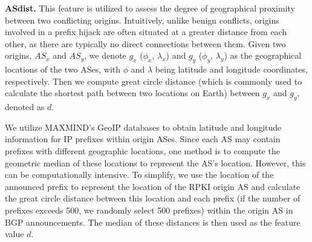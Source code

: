 \noindent\textbf{ASdist.} This feature is utilized to assess the degree of geographical proximity between two conflicting origins. Intuitively, unlike benign conflicts, origins involved in a prefix hijack are often situated at a greater distance from each other, as there are typically no direct connections between them.
Given two origins, $AS_{x}$ and $AS_{y}$, we denote $g_{x}$ ($\phi_x$, $\lambda_x$) and $g_{y}$ ($\phi_y$, $\lambda_y$) as the geographical locations of the two ASes, with $\phi$ and $\lambda$ being latitude and longitude coordinates, respectively.
Then we compute great circle distance (which is commonly used to calculate the shortest path between two locations on Earth) between $g_{x}$ and $g_{y}$, denoted as $d$.

We utilize MAXMIND's GeoIP databases to obtain latitude and longitude information for IP prefixes within origin ASes. Since each AS may contain prefixes with different geographic locations, one method is to compute the geometric median of these locations to represent the AS’s location. However, this can be computationally intensive. To simplify, we use the location of the announced prefix to represent the location of the RPKI origin AS and calculate the great circle distance between this location and each prefix (if the number of prefixes exceeds 500, we randomly select 500 prefixes) within the origin AS in BGP announcements. The median of these distances is then used as the feature value $d$.

